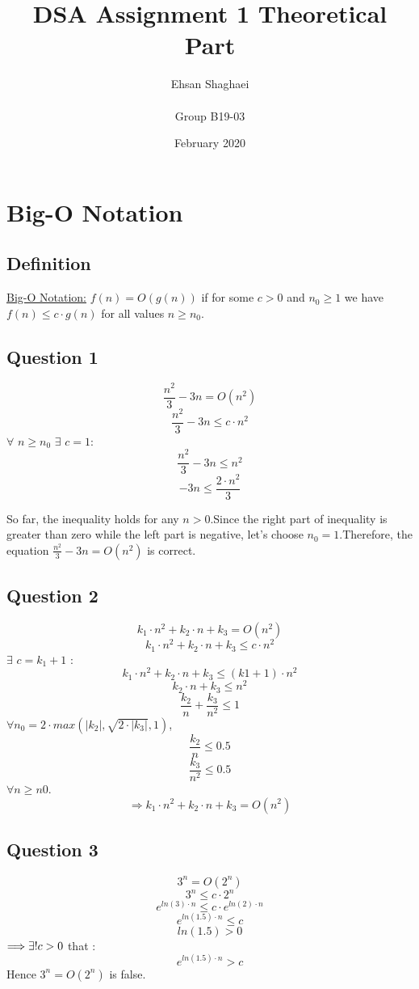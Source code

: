 \documentclass{article}
\title{DSA Assignment 1 Theoretical Part}
\author{
Ehsan Shaghaei
\\
\email{E.Shaghaei@innopolis.University}
\\
Group B19-03
}
\date{February 2020}
\begin{document}
\maketitle

\tableofcontents
\section{Big-O Notation}
\subsection{Definition}
\underline{Big-O Notation:}\vspace{1mm}
$f(n) = O(g(n))$ if for some $ c > 0 $ and $ n_0 \geq 1 $ we have $ f(n) \leq c \cdot g(n)$ for all values $ n \geq n_0 $.
\subsection{Question 1}
\begin{center}
$$\frac{n^2}{3} - 3n = O(n^2)$$ 
$$\frac{n^2}{3} - 3n \leq c \cdot n^2$$
$\forall$ \hspace{2mm}  $n \geq n_0$
$\exists$ \hspace{2mm} $c = 1$:
$$\frac{n^2}{3} - 3n \leq n^2$$
$$- 3n \leq \frac{2 \cdot n^2}{3}$$
\end{center}
So far, the inequality holds for any $n>0$.Since the right part of inequality is greater than zero while the left part is negative, let's choose $n_0 = 1$.Therefore, the equation $\frac{n^2}{3} - 3n = O(n^2)$ is correct.
\subsection{Question 2}
$$k_1 \cdot n^2 + k_2 \cdot n + k_3 = O(n^2)$$
$$k_1 \cdot n^2 + k_2 \cdot n + k_3 \leq c \cdot n^2$$
$\exists$ \hspace{2mm} $ c = k_1 + 1$ :
$$k_1 \cdot n^2 + k_2 \cdot n + k_3 \leq (k1 + 1) \cdot n^2$$
$$k_2 \cdot n + k_3 \leq n^2$$
$$\frac{k_2}{n} + \frac{k_3}{n^2} \leq 1$$
$\forall n_0 = 2 \cdot max(|k_2|, \sqrt{2 \cdot |k_3|}, 1)$,
$$ \frac{k_2}{n} \leq 0.5$$
$$ \frac{k_3}{n^2} \leq 0.5$$ 
$\forall n \geq n0$.\\ 
$$\Longrightarrow k_1 \cdot n^2 + k_2 \cdot n + k_3 = O(n^2)$$ 
\subsection{Question 3}
$$3^n = O(2^n)$$
$$3^n \leq c \cdot 2^n$$
$$e^{ln(3) \cdot n} \leq c \cdot e^{ln(2)\cdot n}$$
$$e^{ln(1.5)\cdot n} \leq c$$
$$ln(1.5) > 0$$
$\Longrightarrow \vspace{1mm} \exists! c>0$ that :
$$e^{ln(1.5)\cdot n} > c$$
Hence $3^n = O(2^n)$ is false.
\end{document}
